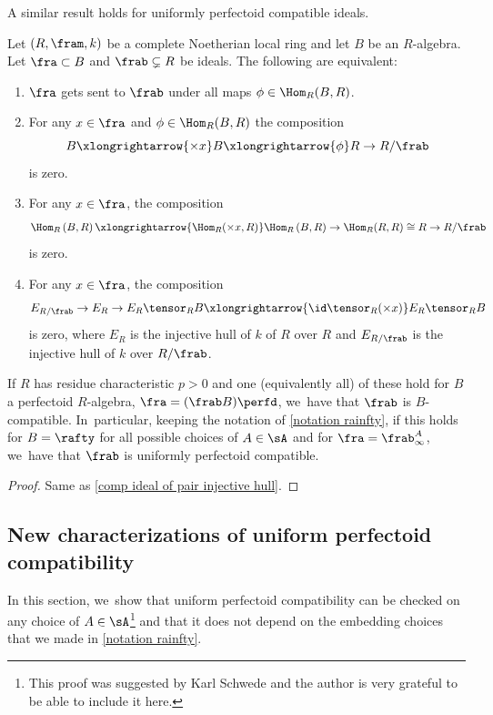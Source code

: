 A similar result holds for uniformly perfectoid compatible ideals.

\begin{proposition}\label{uniformly compatible injective hull}
Let $(R,\fram,k)$ be a complete Noetherian local ring and let $B$ be an $R$\nobreakdash-algebra.
Let $\fra\subset B$ and $\frab \subsetneq R$ be ideals. The following are equivalent:
\begin{enumerate}
\item $\fra$ gets sent to $\frab$ under all maps $\phi\in \Hom_R(B,R)$.
\item For any $x\in \fra$ and $\phi \in \Hom_R(B,R)$ the composition
\[
B \xlongrightarrow{\times x} B \xlongrightarrow{\phi} R \to R/\frab
\]
is zero.
\item For any $x\in \fra$, the composition
\[
\Hom_R\left(B,R\right)\xlongrightarrow{\Hom_R(\times x, R)}\Hom_R\left(B,R\right) \to \Hom_R(R,R)\cong R \to R/\frab
\]
is zero.
\item
For any $x\in \fra$, the composition
\[
E_{R/\frab} \to E_R \to E_R\tensor_R B \xlongrightarrow{\id\tensor_R (\times x)} E_R\tensor_R B
\]
is zero, where $E_R$ is the injective hull of $k$ of $R$ over $R$ and $E_{R/\frab} $ is the injective hull of $k$ over $R/\frab$.
\end{enumerate}

If $R$ has residue characteristic $p>0$ and one (equivalently all) of these hold for $B$ a perfectoid $R$\nobreakdash-algebra, $\fra=(\frab B)\perfd$, we~have that $\frab$ is $B$-compatible. In~particular, keeping the notation of \autoref{notation rainfty},
if this holds for $B=\rafty$ for all possible
choices of $A\in \sA$ and for $\fra=\frab^A_\infty$, we~have that $\frab$ is uniformly perfectoid compatible.
\end{proposition}

\begin{proof}
Same as \autoref{comp ideal of pair injective hull}.
\end{proof}

\subsection{New characterizations of uniform perfectoid compatibility} In this section, we~show that uniform perfectoid compatibility can be checked on any choice of $A\in \sA$\footnote{
This proof was suggested by Karl Schwede and the author is very grateful to be able to include it here.} and that it does not depend on the embedding choices that we made in \autoref{notation rainfty}.
\smallskip

